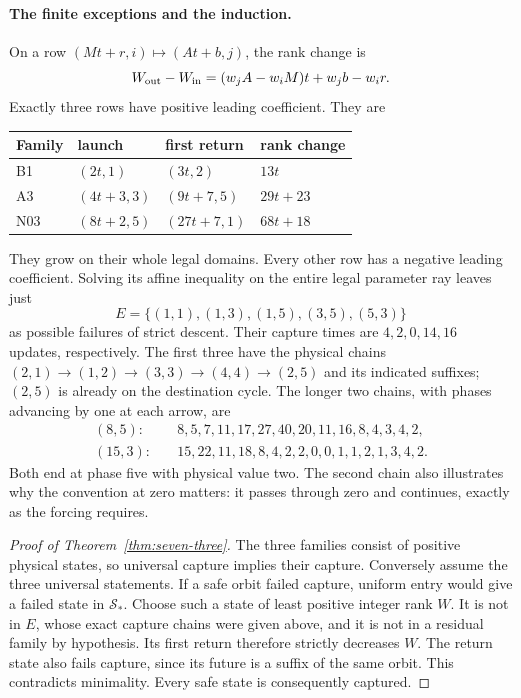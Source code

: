 \paragraph{The finite exceptions and the induction.}
On a row $(Mt+r,i)\mapsto(At+b,j)$, the rank change is
\[
 W_{\rm out}-W_{\rm in}=(w_jA-w_iM)t+w_jb-w_ir.
\]
Exactly three rows have positive leading coefficient.  They are
\begin{center}
\begin{tabular}{llll}\toprule
Family&launch&first return&rank change\\\midrule
B1&$(2t,1)$&$(3t,2)$&$13t$\\
A3&$(4t+3,3)$&$(9t+7,5)$&$29t+23$\\
N03&$(8t+2,5)$&$(27t+7,1)$&$68t+18$\\\bottomrule
\end{tabular}
\end{center}
They grow on their whole legal domains.  Every other row has a negative
leading coefficient.  Solving its affine inequality on the entire legal
parameter ray leaves just
\[
 E=\{(1,1),(1,3),(1,5),(3,5),(5,3)\}
\]
as possible failures of strict descent.  Their capture times are
$4,2,0,14,16$ updates, respectively.  The first three have the physical
chains $(2,1)\to(1,2)\to(3,3)\to(4,4)\to(2,5)$ and its indicated
suffixes; $(2,5)$ is already on the destination cycle.  The longer two
chains, with phases advancing by one at each arrow, are
\begin{align*}
 (8,5):\quad&8,5,7,11,17,27,40,20,11,16,8,4,3,4,2,\\
 (15,3):\quad&15,22,11,18,8,4,2,2,0,0,1,1,2,1,3,4,2.
\end{align*}
Both end at phase five with physical value two.  The second chain
also illustrates why the convention at zero matters: it passes through
zero and continues, exactly as the forcing requires.

\begin{proof}[Proof of Theorem~\ref{thm:seven-three}]
The three families consist of positive physical states, so universal
capture implies their capture.  Conversely assume the three universal
statements.  If a safe orbit failed capture, uniform entry would give
a failed state in $\mathcal S_*$.  Choose such a state of least positive
integer rank $W$.  It is not in $E$, whose exact capture chains were
given above, and it is not in a residual family by hypothesis.
Its first return therefore strictly decreases $W$.  The return state
also fails capture, since its future is a suffix of the same orbit.
This contradicts minimality.  Every safe state is consequently captured.
\end{proof}

